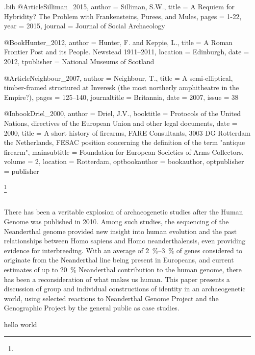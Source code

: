 \begin{filecontents}{\identifier.bib}
@Article{Silliman_2015,
  author =  {Silliman, S.W.},
  title =   {A Requiem for Hybridity? The Problem with Frankensteins, Purees, and Mules},
  pages =   {1-22},
  year =    {2015},
  journal = {Journal of Social Archaeology}
}

@Book{Hunter_2012,
  author =     {Hunter, F. and Keppie, L.},
  title =      {A Roman Frontier Post and its People. Newstead 1911–2011},
  location =   {Edinburgh},
  date =       {2012},
  tpublisher = {National Museums of Scotland}
}

@Article{Neighbour_2007,
  author =       {Neighbour, T.},
  title =        {A semi-elliptical, timber-framed structured at Inveresk (the most northerly amphitheatre in the Empire?)},
  pages =        {125–140},
  journaltitle = {Britannia},
  date =         {2007},
  issue =        {38}
}

@Inbook{Driel_2000,
  author =        {Driel, J.V.},
  booktitle =     {Protocols of the United Nations, directives of the European Union and other legal documents},
  date =          {2000},
  title =         {A short history of firearms, FARE Consultants, 3003 DG Rotterdam the Netherlands, FESAC position concerning the definition of the term "antique firearm"},
  mainsubtitle =  {Foundation for European Societies of Arms Collectors},
  volume =        {2},
  location =      {Rotterdam},
  optbookauthor = {bookauthor},
  optpublisher =  {publisher}
}


\end{filecontents}

	

\openingarticle

	{\Large\scshape
	\shortauthor\footnote{\thanknote}}\\[1em]
	\email\\
	\affiliation

\midarticle

\begin{myabstract}
There has been a veritable explosion of archaeogenetic studies after the Human Genome was published in 2010. Among such studies, the sequencing of the Neanderthal genome provided new insight into human evolution and the past relationships between Homo sapiens and Homo neanderthalensis, even providing evidence for interbreeding. With an average of \SIrange[range-phrase=--]{2}{3}{\percent} of genes considered to originate from the Neanderthal line being present in Europeans, and current estimates of up to \SI{20}{\percent} Neanderthal contribution to the human genome, there has been a reconsideration of what makes us human. This paper presents a discussion of group and individual constructions of identity in an archaeogenetic world, using selected reactions to Neanderthal Genome Project and the Genographic Project by the general public as case studies.

\end{myabstract}


hello world

\cite{Zeder_2006c,Green_2010,Wilson_2012,Caruana_1996,Mizoguchi_2015,Sayer_2013,Liddell1940,Meyer_2012,Thapar_1991,Trigger_2006a,Trigger_2006,Leidwanger_2014,Lal_2001,Meta2006,Tilley_1994,Monfort_2006,OBrien2009,Silliman_2015,Hunter_2012,Neighbour_2007,Driel_2000}
\closingarticle
